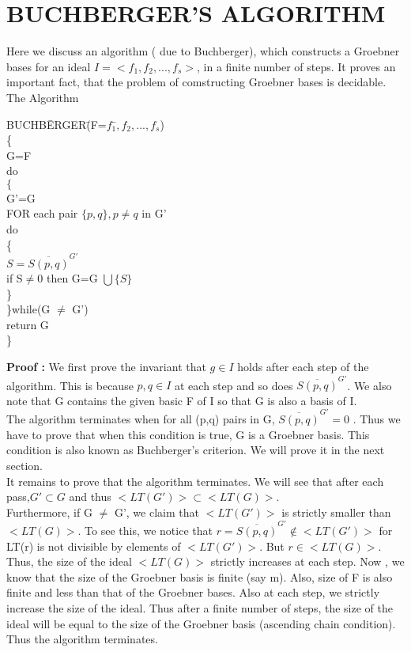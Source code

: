 \documentclass[12pt]{article}
\begin{document}
\section{BUCHBERGER'S ALGORITHM}
Here we discuss an algorithm ( due to Buchberger), which constructs a Groebner bases for an ideal $I = <f_{1},f_{2},...,f_{s}>$, in a finite number of steps. It proves an important fact, that the problem of comstructing Groebner bases is decidable.\\
The Algorithm\\
\begin{tabbing}
BUCHB\= ERGER\= (F=$f_{1}$\=$,f_{2},...,f_{s}$)\\
\{\\
\> G=F\\
\> do\\
\> $\{$\\
\>\> G'=G\\
\>\> FOR each pair $\{p,q\}, p\neq q$ in G'\\
\>\> do\\
\>\> \{\\
\>\>\> $S= \overline{S(p,q)}^{G'}$\\
\>\>\> if S$\neq$0 then G=G $\bigcup \{S\}$\\
\>\> \}\\
\> \}while(G $\neq$ G')\\
\> return G\\
\}\\
\end{tabbing}
{\bf Proof :} We first prove the invariant that $g \in I$ holds after each step of the algorithm. This is because $p, q \in I$ at each step and so does $\overline{S(p,q)}^{G'}$. We also note that G contains the given basic F of I so that G is also a basis of I.\\
The algorithm terminates when for all (p,q) pairs in G, $\overline{S(p,q)}^{G'}=0$ . Thus we have to prove that when this condition is true, G is a Groebner basis.  This condition is also known as Buchberger's criterion. We will prove it in the next section.\\
It remains to prove that the algorithm terminates. We will see that after each pass,$G' \subset G$  and thus $<LT(G')> \subset <LT(G)>$.\\
Furthermore, if G $\neq$ G', we claim that $<LT(G')>$ is strictly smaller than $<LT(G)>$. To see this, we notice that $r=\overline{S(p,q)}^{G'} \notin <LT(G')>$ for LT(r) is not divisible by elements of $<LT(G')>$. But $r \in <LT(G)>$.\\
Thus, the size of the ideal $<LT(G)>$ strictly increases at each step. Now , we know that the size of the Groebner basis is finite (say m). Also, size of F is also finite and less than that of the Groebner bases. Also at each step, we strictly increase the size of the ideal. Thus after a finite number of steps, the size of the ideal will be equal to the size of the Groebner basis (ascending chain condition). Thus the algorithm terminates.
\newpage
\end{document}
